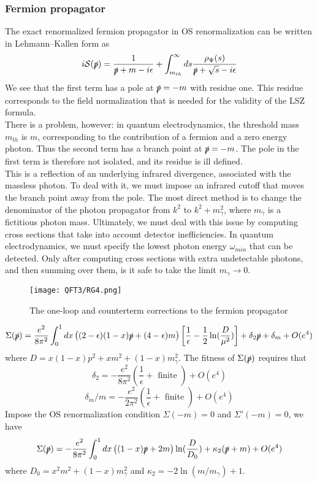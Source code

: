 \subsubsection{Fermion propagator}
The exact renormalized fermion propagator in OS renormalization can be written in Lehmann–Kallen form as
\[i\mathcal{S}(\slashed{p}) = \frac{1}{\slashed{p}+m-i\epsilon} + \int_{m_{th}}^{\infty} ds \frac{\rho_{\Psi}(s)}{\slashed{p}+\sqrt{s}-i\epsilon}\]
We see that the first term has a pole at $\slashed{p}=-m$ with residue one. This residue corresponds to the field normalization that is needed for the validity of the LSZ formula.
\\
There is a problem, however: in quantum electrodynamics, the threshold mass $m_{th}$ is $m$, corresponding to the contribution of a fermion and a zero energy photon. Thus the second term has a branch point at $\slashed{p}=-m$. The pole in the first term is therefore not isolated, and its residue is ill defined.
\\
This is a reflection of an underlying infrared divergence, associated with the massless photon. To deal with it, we must impose an infrared cutoff that moves the branch point away from the pole. The most direct method is to change the denominator of the photon propagator from $k^2$ to $k^2+m_{\gamma}^2$, where $m_{\gamma}$ is a fictitious photon mass. Ultimately, we must deal with this issue by computing cross sections that take into account detector inefficiencies. In quantum electrodynamics, we must specify the
lowest photon energy $\omega_{min}$ that can be detected. Only after computing cross sections with extra undetectable photons, and then summing over them, is it safe to take the limit $m_{\gamma} \to 0$. 
\begin{figure}[!h]
\centering
\texttt{[image: QFT3/RG4.png]}
\caption{The one-loop and counterterm corrections to the fermion propagator}
\end{figure}
\[\Sigma(\slashed{p}) = \frac{e^2}{8\pi^2} \int_0^1 dx \left( (2-\epsilon)(1-x)\slashed{p} + (4-\epsilon)m \right) \left[ \frac{1}{\epsilon} - \frac{1}{2}\ln(\frac{D}{\mu^2})\right] + \delta_2 \slashed{p} + \delta_m + O(e^4) \]
where $D = x(1-x)p^2 + xm^2 + (1-x)m_{\gamma}^2$.
The fitness of $\Sigma(\slashed{p})$ requires that
\[\delta_2 =  - \frac{e^2}{8\pi^2} \left( \frac{1}{\epsilon} + \mbox{ finite } \right) + O(e^4)\]
\[\delta_m/m = - \frac{e^2}{2\pi^2} \left( \frac{1}{\epsilon} + \mbox{ finite } \right) + O(e^4) \]
Impose the OS renormalization condition $\Sigma(-m) = 0$ and $\Sigma'(-m) = 0$, we have
\[\Sigma(\slashed{p}) = -\frac{e^2}{8\pi^2} \int_0^1 dx \left( (1-x)\slashed{p} + 2m \right) \ln(\frac{D}{D_0})  + \kappa_2( \slashed{p} + m) + O(e^4) \]
where $D_0 = x^2m^2 +(1-x)m_{\gamma}^2$ and $\kappa_2 = -2 \ln(m/m_{\gamma})+1$. 

